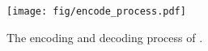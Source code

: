 \begin{figure}[t] 
    \centering 
    \texttt{[image: fig/encode\_process.pdf]}  
    \caption{The encoding and decoding process of \proj.} 
    \label{fig:encode_process}
\end{figure}